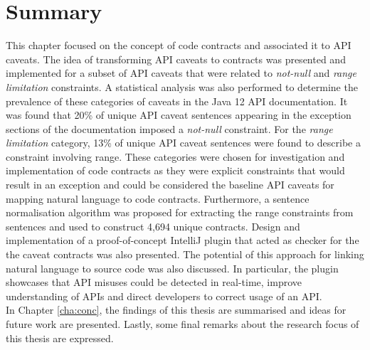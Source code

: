 \section{Summary}
\label{sec:contract-summary}
This chapter focused on the concept of code contracts and associated it to API caveats. The idea of transforming API caveats to contracts was presented and implemented for a subset of API caveats that were related to \textit{not-null} and \textit{range limitation} constraints. A statistical analysis was also performed to determine the prevalence of these categories of caveats in the Java 12 API documentation. It was found that 20\% of unique API caveat sentences appearing in the exception sections of the documentation imposed a \textit{not-null} constraint. For the \textit{range limitation} category, 13\% of unique API caveat sentences were found to describe a constraint involving range. These categories were chosen for investigation and implementation of code contracts as they were explicit constraints that would result in an exception and could be considered the baseline API caveats for mapping natural language to code contracts. Furthermore, a sentence normalisation algorithm was proposed for extracting the range constraints from sentences and used to construct 4,694 unique contracts. Design and implementation of a proof-of-concept IntelliJ plugin that acted as checker for the the caveat contracts was also presented. The potential of this approach for linking natural language to source code was also discussed. In particular, the plugin showcases that API misuses could be detected in real-time, improve understanding of APIs and direct developers to correct usage of an API.\\
In Chapter \ref{cha:conc}, the findings of this thesis are summarised and ideas for future work are presented. Lastly, some final remarks about the research focus of this thesis are expressed.
